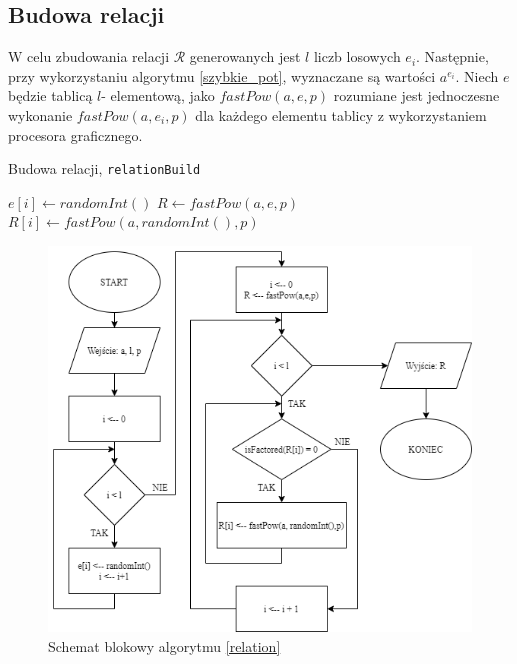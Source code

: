 \documentclass[]{article}
\begin{document}
	
\clearpage
	\subsection{Budowa relacji}
		W celu zbudowania relacji \(\mathcal{R}\) generowanych jest \(l\) liczb losowych \(e_i\). Następnie, przy wykorzystaniu algorytmu \ref{szybkie_pot}, wyznaczane są wartości \(a^{e_i}\). 
		\newline
		Niech \(e\) będzie tablicą \(l\)- elementową, jako \(fastPow(a, e, p)\) rozumiane jest jednoczesne wykonanie \(fastPow(a, e_i, p)\) dla każdego elementu tablicy z wykorzystaniem procesora graficznego. 
		\newline
		\begin{algorithm}[H]
			\SetAlgoLined
			\caption{Budowa relacji, \texttt{relationBuild}}
			\label{relation}
			{
				\(e[i] \gets randomInt()\)
			}
			\(R \gets fastPow(a, e, p)\) \\
			{
				{
					\(R[i] \gets fastPow(a, randomInt(), p)\)
				}
			}
		
		\end{algorithm}

\clearpage
	\begin{figure}[H]
		\begin{center}
			\includegraphics[width=13cm]{alg 6.png} \caption{Schemat blokowy algorytmu \ref{relation}}
		\end{center}
	\end{figure}
\end{document}
